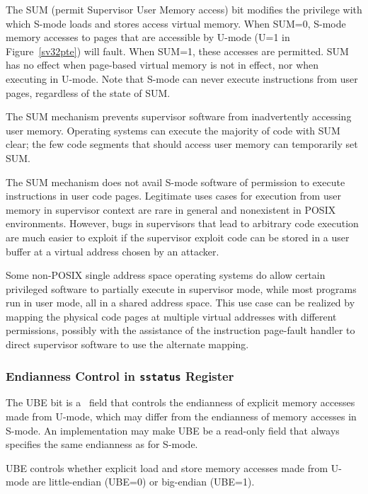 The SUM (permit Supervisor User Memory access) bit modifies the privilege with
which S-mode loads and stores access virtual memory.
When SUM=0, S-mode memory accesses to pages that are accessible by U-mode (U=1
in Figure~\ref{sv32pte}) will fault.  When SUM=1, these accesses are permitted.
SUM has no effect when page-based virtual memory is not in effect, nor when
executing in U-mode.  Note that S-mode can never execute instructions from user
pages, regardless of the state of SUM.

\begin{commentary}
The SUM mechanism prevents supervisor software from inadvertently accessing
user memory.  Operating systems can execute the majority of code with SUM clear;
the few code segments that should access user memory can temporarily set
SUM.

The SUM mechanism does not avail S-mode software of permission to execute
instructions in user code pages.  Legitimate uses cases for execution from
user memory in supervisor context are rare in general and nonexistent in POSIX
environments.  However, bugs in supervisors that lead to arbitrary code
execution are much easier to exploit if the supervisor exploit code can be
stored in a user buffer at a virtual address chosen by an attacker.

Some non-POSIX single address space operating systems do allow certain
privileged software to partially execute in supervisor mode, while most
programs run in user mode, all in a shared address space.  This use case can
be realized by mapping the physical code pages at multiple virtual addresses
with different permissions, possibly with the assistance of the
instruction page-fault handler to direct supervisor software to use the
alternate mapping.
\end{commentary}

\subsubsection{Endianness Control in {\tt sstatus} Register}

The UBE bit is a \warl\ field that controls the endianness of explicit
memory accesses made from U-mode, which may differ from the endianness of
memory accesses in S-mode.
An implementation may make UBE be a read-only field that always specifies
the same endianness as for S-mode.

UBE controls whether explicit
load and store memory accesses made from U-mode are little-endian (UBE=0)
or big-endian (UBE=1).

